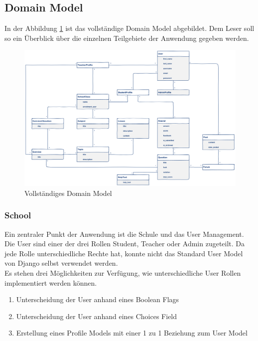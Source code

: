 \subsection{Domain Model}
In der Abbildung \ref{fig:domain_model_full} ist das vollständige Domain Model abgebildet. Dem Leser soll so ein Überblick über die einzelnen Teilgebiete der Anwendung gegeben werden.

	\begin{figure}[H]
	\begin{center}
	
		\includegraphics[width=1.4\textwidth, keepaspectratio, angle=90]{images/domain_model_full.png}
  		\caption{Vollständiges Domain Model}
		\label{fig:domain_model_full}
		\end{center}
\end{figure}

\newpage
\subsubsection*{School}
Ein zentraler Punkt der Anwendung ist die Schule und das User Management. Die User sind einer der drei Rollen Student, Teacher oder Admin zugeteilt. Da jede Rolle unterschiedliche Rechte hat, konnte nicht das Standard User Model von Django selbst verwendet werden. \\
Es stehen drei Möglichkeiten zur Verfügung, wie unterschiedliche User Rollen implementiert werden können.

\begin{enumerate}
	\item Unterscheidung der User anhand eines Boolean Flags
	\item Unterscheidung der User anhand eines Choices Field 
	\item Erstellung eines Profile Models mit einer 1 zu 1 Beziehung zum User Model
\end{enumerate}

